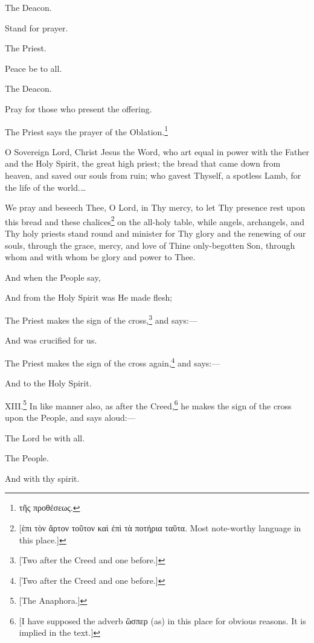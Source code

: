 The Deacon.

Stand for prayer.

The Priest.

Peace be to all.

The Deacon.

Pray for those who present the offering.

The Priest says the prayer of the Oblation.\footnote{\par  \textgreek{τῆς προθἐσεως}.}

O Sovereign Lord, Christ Jesus the Word, who art equal in power with the Father and the Holy Spirit, the great high priest; the bread that came down from heaven, and saved our souls from ruin; who gavest Thyself, a spotless Lamb, for the life of the world.…

We pray and beseech Thee, O Lord, in Thy mercy, to let Thy presence rest upon this bread and these chalices\footnote{\par{}  [\textgreek{ὲπι τὸν ἄρτον τοῦτον καὶ ἐπὶ τὰ ποτήρια ταῦτα}. Most note-worthy language in this place.]} on the all-holy table, while angels, archangels, and Thy holy priests stand round and minister for Thy glory and the renewing of our souls, through the grace, mercy, and love of Thine only-begotten Son, through whom and with whom be glory and power to Thee.

And when the People say,

And from the Holy Spirit was He made flesh;

The Priest makes the sign of the cross,\footnote{\par{}  [Two after the Creed and one before.]} and says:—

And was crucified for us.

The Priest makes the sign of the cross again,\footnote{\par{}  [Two after the Creed and one before.]} and says:—

And to the Holy Spirit.

XIII.\footnote{\par{}  [The Anaphora.]} In like manner also, as after the Creed,\footnote{\par{}  [I have supposed the adverb \textgreek{ὣσπερ} (as) in this place for obvious reasons. It is implied in the text.]} he makes the sign of the cross upon the People, and says aloud:—

The Lord be with all.

The People.

And with thy spirit.

